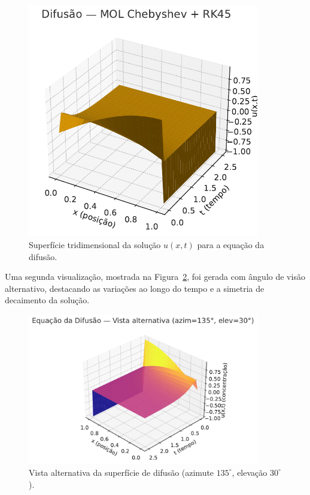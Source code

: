 \documentclass[12pt,a4paper]{article}
\begin{document}
\begin{figure}[H]
    \centering
    \includegraphics[width=0.9\textwidth]{figures/ex3_surface_3d.pdf}
    \caption{Superfície tridimensional da solução $u(x,t)$ para a equação da difusão.}
    \label{fig:ex3_surface_3d}
\end{figure}

Uma segunda visualização, mostrada na Figura~\ref{fig:ex3_surface_3d_alt}, foi gerada com ângulo de visão alternativo, destacando as variações ao longo do tempo e a simetria de decaimento da solução.

\begin{figure}[H]
    \centering
    \includegraphics[width=0.9\textwidth]{figures/ex3_surface_3d_alt.pdf}
    \caption{Vista alternativa da superfície de difusão (azimute $135^\circ$, elevação $30^\circ$).}
    \label{fig:ex3_surface_3d_alt}
\end{figure}
\end{document}
